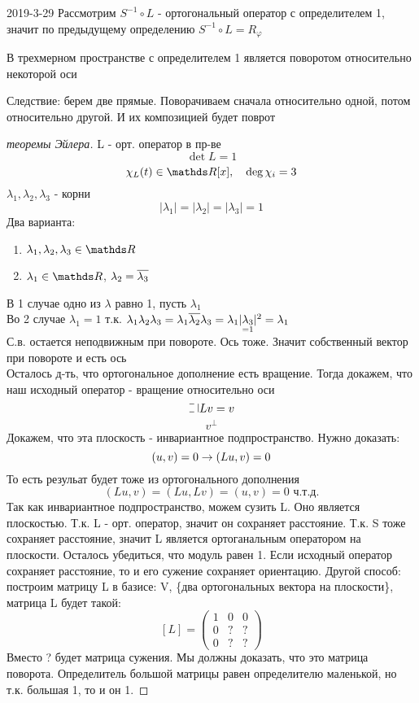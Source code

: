 \documentclass[main]{subfiles}
\begin{document}
\begin{lect}{2019-3-29}
    Рассмотрим $S^{-1} \circ L$ - ортогональный оператор с определителем 1, значит по предыдущему определению $S^{-1} \circ L = R_{\varphi}$

    \begin{utv}
      В трехмерном пространстве с определителем 1 является поворотом относительно некоторой оси
    \end{utv}

    Следствие: берем две прямые. Поворачиваем сначала относительно одной, потом относительно другой. И их композицией будет поврот

    \begin{proof}[теоремы Эйлера]
      L - орт. оператор в пр-ве
      \[\det L = 1\]
      \[\chi_L(t) \in \R[x],\q \deg \chi_i = 3\]
      $\lambda_1, \lambda_2, \lambda_3$ - корни
      \[|\lambda_1| = |\lambda_2| = |\lambda_3| = 1\]
      Два варианта:
      \begin{enumerate}
        \item $\lambda_1, \lambda_2, \lambda_3 \in \R$
        \item $\lambda_1 \in \R$, $\lambda_2 = \overline{\lambda_3}$
      \end{enumerate}
      В 1 случае одно из $\lambda$ равно 1, пусть $\lambda_1$\\
      Во 2 случае $\lambda_1 = 1$ т.к. $\lambda_1 \lambda_2 \lambda_3 = \lambda_1 \overline{\lambda_2} \lambda_3 = \lambda_1 |\underset{=1}{\lambda_3}|^2 = \lambda_1$\\
      С.в. остается неподвижным при повороте. Ось тоже. Значит собственный вектор  при повороте и есть ось\\
      Осталось д-ть, что ортогональное дополнение есть вращение. Тогда докажем, что наш исходный оператор - вращение относительно оси
      \[\letus Lv = v\]
      \[v^{\bot}\]
      Докажем, что эта плоскость - инвариантное подпространство. Нужно доказать:
      \[(u,v) = 0 \rightarrow (Lu, v) = 0\]
      То есть резульат будет тоже из ортогонального дополнения
      \[(Lu,v) = (Lu, Lv) = (u,v) = 0 \text{ ч.т.д.}\]
      Так как инвариантное подпространство, можем сузить L. Оно является плоскостью. Т.к. L - орт. оператор, значит он сохраняет расстояние. Т.к. S тоже сохраняет расстояние, значит L является ортоганальным оператором на плоскости. Осталось убедиться, что модуль равен 1. Если исходный оператор сохраняет расстояние, то и его сужение сохраняет ориентацию. Другой способ: построим матрицу L в базисе: V, \{два ортогональных вектора на плоскости\}, матрица L будет такой:\\
      \[[L] = \begin{pmatrix}
        1 & 0 & 0\\
        0 & ? & ?\\
        0 & ? & ?
      \end{pmatrix}\]
      Вместо ? будет матрица сужения. Мы должны доказать, что это матрица поворота. Определитель большой матрицы равен определителю маленькой, но т.к. большая 1, то и он 1.


\end{proof}
\end{lect}
\end{document}
